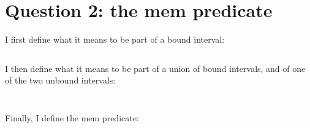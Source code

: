 \section{Question 2: the mem predicate}

I first define what it means to be part of a bound interval:
\inputminted{\whyml}{why3code/mem_interval.mlw}

I then define what it means to be part of a union of bound intervals, and of one of
the two unbound intervals:
\inputminted{\whyml}{why3code/mem_union.mlw}
\inputminted{\whyml}{why3code/mem_unbound.mlw}

Finally, I define the mem predicate:
\inputminted{\whyml}{why3code/mem.mlw}
